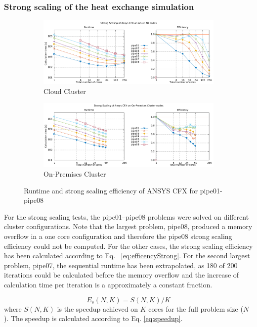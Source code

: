 \documentclass[3p,times]{elsarticle}
\begin{document}
\subsubsection{Strong scaling of the heat exchange simulation}
\begin{figure}

	\begin{subfigure}{\textwidth}
		\centering
		\includegraphics[width=.7\linewidth]{gplt-a8-strong-pipe}	
		\caption{Cloud Cluster}
		\label{fig:strongA8}
	\end{subfigure}

		\begin{subfigure}{\textwidth}
			\centering
			\includegraphics[width=.7\linewidth]{gplt-hsr-strong-pipe}
			\caption{On-Premises Cluster}
			\label{fig:strongHSR}
		\end{subfigure}
	\caption{Runtime and strong scaling efficiency of ANSYS CFX for pipe01-pipe08}
\end{figure}

For the strong scaling tests, the pipe01--pipe08 problems were solved on different cluster configurations. Note that the largest problem, pipe08, produced a memory overflow in a one core configuration and therefore the pipe08 strong scaling efficiency could not be computed. For the other cases, the strong scaling efficiency has been calculated according to Eq.~ \ref{eq:efficencyStrong}. For the second largest problem, pipe07, the sequential runtime has been extrapolated, as 180 of 200 iterations could be calculated before the memory overflow and the increase of calculation time per iteration is a approximately a constant fraction.

\begin{equation}
\label{eq:efficencyStrong}
E_s(N,K) = S(N,K) / K 
\end{equation}
where $S(N,K)$ is the speedup achieved on $K$ cores for the full problem size ($N$). The speedup is calculated according to Eq. \ref{eq:speedup}.
\end{document}
